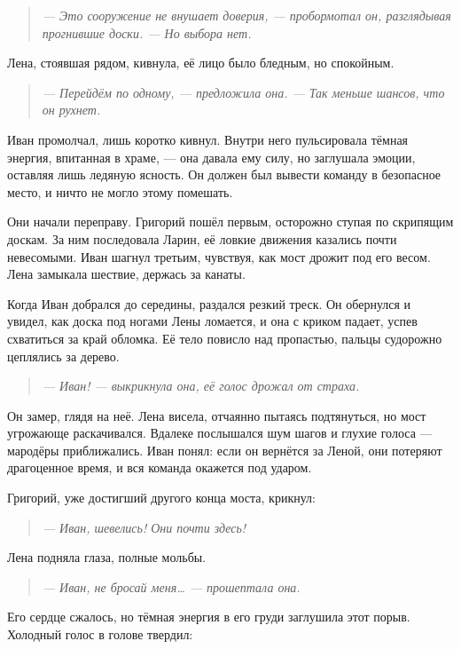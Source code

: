 \documentclass[12pt,a4paper]{book}
\newenvironment{dialogue}{\begin{quote}\itshape}{\end{quote}}
\begin{document}
\begin{dialogue}
--- Это сооружение не внушает доверия, --- пробормотал он, разглядывая прогнившие доски. --- Но выбора нет.
\end{dialogue}

Лена, стоявшая рядом, кивнула, её лицо было бледным, но спокойным.

\begin{dialogue}
--- Перейдём по одному, --- предложила она. --- Так меньше шансов, что он рухнет.
\end{dialogue}

Иван промолчал, лишь коротко кивнул. Внутри него пульсировала тёмная энергия, впитанная в храме, --- она давала ему силу, но заглушала эмоции, оставляя лишь ледяную ясность. Он должен был вывести команду в безопасное место, и ничто не могло этому помешать.

Они начали переправу. Григорий пошёл первым, осторожно ступая по скрипящим доскам. За ним последовала Ларин, её ловкие движения казались почти невесомыми. Иван шагнул третьим, чувствуя, как мост дрожит под его весом. Лена замыкала шествие, держась за канаты.

Когда Иван добрался до середины, раздался резкий треск. Он обернулся и увидел, как доска под ногами Лены ломается, и она с криком падает, успев схватиться за край обломка. Её тело повисло над пропастью, пальцы судорожно цеплялись за дерево.

\begin{dialogue}
--- Иван! --- выкрикнула она, её голос дрожал от страха.
\end{dialogue}

Он замер, глядя на неё. Лена висела, отчаянно пытаясь подтянуться, но мост угрожающе раскачивался. Вдалеке послышался шум шагов и глухие голоса --- мародёры приближались. Иван понял: если он вернётся за Леной, они потеряют драгоценное время, и вся команда окажется под ударом.

Григорий, уже достигший другого конца моста, крикнул:

\begin{dialogue}
--- Иван, шевелись! Они почти здесь!
\end{dialogue}

Лена подняла глаза, полные мольбы.

\begin{dialogue}
--- Иван, не бросай меня… --- прошептала она.
\end{dialogue}

Его сердце сжалось, но тёмная энергия в его груди заглушила этот порыв. Холодный голос в голове твердил:
\end{document}
